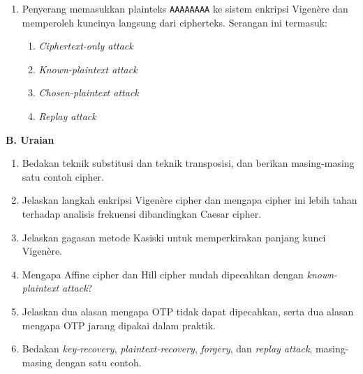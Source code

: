 \documentclass[main.tex]{subfiles}
\begin{document}
\begin{asesmen}
\begin{enumerate}
  \item Penyerang memasukkan plainteks \texttt{AAAAAAAA} ke sistem enkripsi Vigen\`{e}re dan memperoleh kuncinya langsung dari cipherteks. Serangan ini termasuk:
  \begin{enumerate}
    \item \textit{Ciphertext-only attack}
    \item \textit{Known-plaintext attack}
    \item \textit{Chosen-plaintext attack}
    \item \textit{Replay attack}
  \end{enumerate}
\end{enumerate}

\textbf{B. Uraian}

\begin{enumerate}
  \item Bedakan teknik substitusi dan teknik transposisi, dan berikan masing-masing satu contoh cipher.
  \item Jelaskan langkah enkripsi Vigen\`{e}re cipher dan mengapa cipher ini lebih tahan terhadap analisis frekuensi dibandingkan Caesar cipher.
  \item Jelaskan gagasan metode Kasiski untuk memperkirakan panjang kunci Vigen\`{e}re.
  \item Mengapa Affine cipher dan Hill cipher mudah dipecahkan dengan \textit{known-plaintext attack}?
  \item Jelaskan dua alasan mengapa OTP tidak dapat dipecahkan, serta dua alasan mengapa OTP jarang dipakai dalam praktik.
  \item Bedakan \textit{key-recovery}, \textit{plaintext-recovery}, \textit{forgery}, dan \textit{replay attack}, masing-masing dengan satu contoh.
\end{enumerate}
\end{asesmen}

\end{document}
